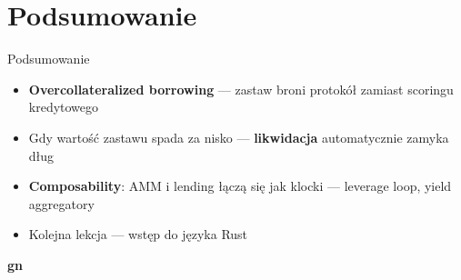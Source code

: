 \section{Podsumowanie}

\begin{frame}{Podsumowanie}
  \begin{itemize}
    \item \textbf{Overcollateralized borrowing} --- zastaw broni protokół zamiast scoringu kredytowego
    \item Gdy wartość zastawu spada za nisko --- \textbf{likwidacja} automatycznie zamyka dług
    \item \textbf{Composability}: AMM i lending łączą się jak klocki --- leverage loop, yield aggregatory
    \item Kolejna lekcja --- wstęp do języka Rust
  \end{itemize}
\end{frame}

\begin{frame}[plain]
  \begin{center}
    \vfill
    {\Huge\bfseries\color{stplwhite} gn}
    \vfill
  \end{center}
\end{frame}


